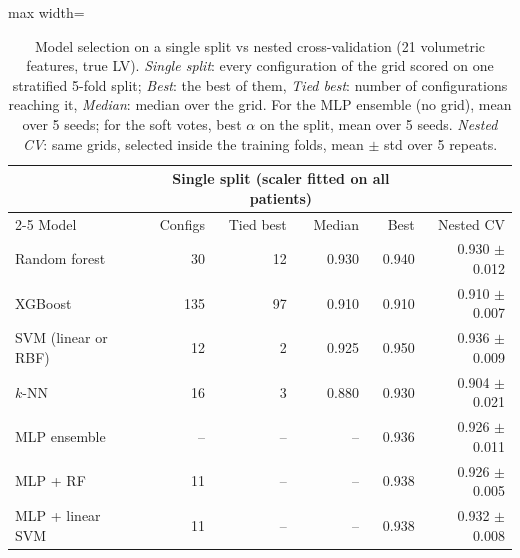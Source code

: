 \begin{table}[!htb]
\centering
\small
\setlength{\tabcolsep}{4pt}
\begin{adjustbox}{max width=\linewidth}
\begin{tabular}{lrrrrr}
\toprule
& \multicolumn{4}{c}{Single split (scaler fitted on all patients)} & \\
\cmidrule(lr){2-5}
Model & Configs & Tied best & Median & Best & Nested CV\\
\midrule
Random forest & 30 & 12 & 0.930 & 0.940 & 0.930 $\pm$ 0.012\\
XGBoost & 135 & 97 & 0.910 & 0.910 & 0.910 $\pm$ 0.007\\
SVM (linear or RBF) & 12 & 2 & 0.925 & 0.950 & 0.936 $\pm$ 0.009\\
$k$-NN & 16 & 3 & 0.880 & 0.930 & 0.904 $\pm$ 0.021\\
MLP ensemble & -- & -- & -- & 0.936 & 0.926 $\pm$ 0.011\\
MLP + RF & 11 & -- & -- & 0.938 & 0.926 $\pm$ 0.005\\
MLP + linear SVM & 11 & -- & -- & 0.938 & 0.932 $\pm$ 0.008\\
\bottomrule
\end{tabular}
\end{adjustbox}
\caption{Model selection on a single split vs nested cross-validation (21 volumetric features, true LV).
\emph{Single split}: every configuration of the grid scored on one stratified 5-fold split; \emph{Best}: the best
of them, \emph{Tied best}: number of configurations reaching it, \emph{Median}: median over the grid. For the
MLP ensemble (no grid), mean over 5 seeds; for the soft votes, best $\alpha$ on the split, mean over 5 seeds.
\emph{Nested CV}: same grids, selected inside the training folds, mean $\pm$ std over 5 repeats.}
\label{tab:protocol-study}
\end{table}
